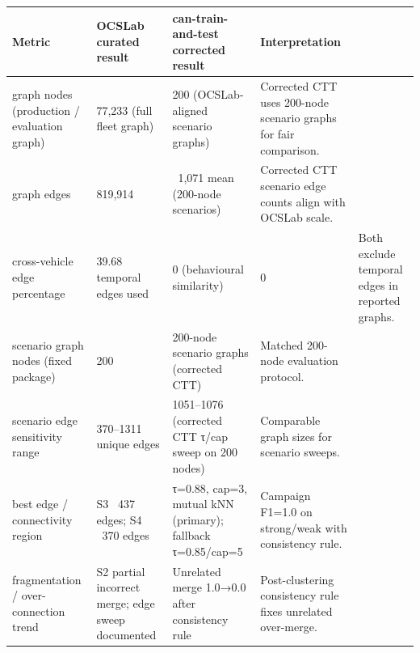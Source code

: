 \begin{tabular}{llll}
\toprule
Metric & OCSLab curated result & can-train-and-test corrected result & Interpretation \\
\midrule
graph nodes (production / evaluation graph) & 77,233 (full fleet graph) & 200 (OCSLab-aligned scenario graphs) & Corrected CTT uses 200-node scenario graphs for fair comparison. \\
graph edges & 819,914 & ~1,071 mean (200-node scenarios) & Corrected CTT scenario edge counts align with OCSLab scale. \\
cross-vehicle edge percentage & 39.68%
temporal edges used & 0 (behavioural similarity) & 0 & Both exclude temporal edges in reported graphs. \\
scenario graph nodes (fixed package) & 200 & 200-node scenario graphs (corrected CTT) & Matched 200-node evaluation protocol. \\
scenario edge sensitivity range & 370–1311 unique edges & 1051–1076 (corrected CTT τ/cap sweep on 200 nodes) & Comparable graph sizes for scenario sweeps. \\
best edge / connectivity region & S3 ~437 edges; S4 ~370 edges & τ=0.88, cap=3, mutual kNN (primary); fallback τ=0.85/cap=5 & Campaign F1=1.0 on strong/weak with consistency rule. \\
fragmentation / over-connection trend & S2 partial incorrect merge; edge sweep documented & Unrelated merge 1.0→0.0 after consistency rule & Post-clustering consistency rule fixes unrelated over-merge. \\
\bottomrule
\end{tabular}
